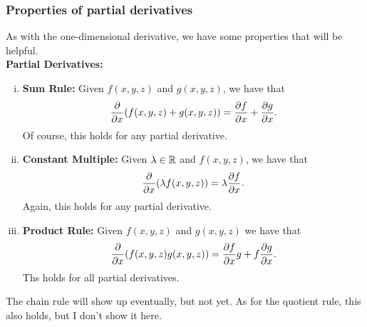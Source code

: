                 \subsubsection{Properties of partial derivatives}
                         
                        As with the one-dimensional derivative, we have some properties that will be helpful.\\
                        
                        \noindent\textbf{Partial Derivatives:}
                        \begin{enumerate}[(i)]
                            \item \textbf{Sum Rule:} Given $f(x,y,z)$ and $g(x,y,z)$, we have that
                            \[
                            \frac{\partial}{\partial x} (f(x,y,z)+g(x,y,z))=\frac{\partial f}{\partial x} + \frac{\partial g}{\partial x}.
                            \]
                            Of course, this holds for any partial derivative.
                            \item \textbf{Constant Multiple:} Given $\lambda \in \mathbb{R}$ and $f(x,y,z)$, we have that
                            \[
                            \frac{\partial}{\partial x}(\lambda f(x,y,z))=\lambda \frac{\partial f}{\partial x}.
                            \]
                            Again, this holds for any partial derivative.
                            \item \textbf{Product Rule:} Given $f(x,y,z)$ and $g(x,y,z)$ we have that
                            \[
                            \frac{\partial }{\partial x}(f(x,y,z)g(x,y,z))=\frac{\partial f}{\partial x} g + f \frac{\partial g}{\partial x}.
                            \]
                            Ths holds for all partial derivatives.
                        \end{enumerate}
                        
                        \begin{remark}
                        The chain rule will show up eventually, but not yet.  As for the quotient rule, this also holds, but I don't show it here.
                        \end{remark}
                        
